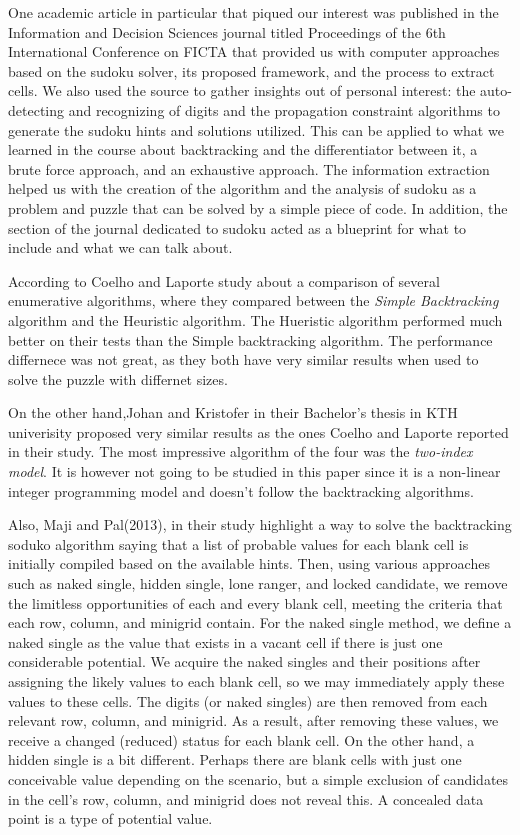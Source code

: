 \documentclass[12pt]{extarticle}
\theoremstyle{plain}
\begin{document}
One academic article in particular that piqued our interest was published in the Information and Decision Sciences journal titled Proceedings of the 6th International Conference on FICTA that provided us with computer approaches based on the sudoku solver, its proposed framework, and the process to extract cells. We also used the source to gather insights out of personal interest: the auto-detecting and recognizing of digits and the propagation constraint algorithms to generate the sudoku hints and solutions utilized. This can be applied to what we learned in the course about backtracking and the differentiator between it, a brute force approach, and an exhaustive approach. The information extraction helped us with the creation of the algorithm and the analysis of sudoku as a problem and puzzle that can be solved by a simple piece of code. In addition, the section of the journal dedicated to sudoku acted as a blueprint for what to include and what we can talk about.

According to Coelho and Laporte study about a comparison of several enumerative algorithms, where they compared between the \textit{Simple Backtracking} algorithm and the Heuristic algorithm. The Hueristic algorithm performed much better on their tests
than the Simple backtracking algorithm. The performance differnece was not great, as they both have very similar results when used to solve the puzzle with differnet sizes.

On the other hand,Johan and Kristofer in their Bachelor's thesis in KTH univerisity proposed very similar results as the ones Coelho and Laporte reported in their study.
The most impressive algorithm of the four was the \textit{two-index model}. It is however not going to be studied in this paper since it is a non-linear integer programming model and doesn't follow the backtracking algorithms.

Also, Maji and Pal(2013), in their study highlight a way to solve the backtracking soduko algorithm saying that a list of probable values for each blank cell is initially compiled based on the available hints. Then, using various approaches such as naked single, hidden single, lone ranger, and locked candidate, we remove the limitless opportunities of each and every blank cell, meeting the criteria that each row, column, and minigrid contain. For the naked single method, we define a naked single as the value that exists in a vacant cell if there is just one considerable potential. We acquire the naked singles and their positions after assigning the likely values to each blank cell, so we may immediately apply these values to these cells. The digits (or naked singles) are then removed from each relevant row, column, and minigrid. As a result, after removing these values, we receive a changed (reduced) status for each blank cell. On the other hand, a hidden single is a bit different. Perhaps there are blank cells with just one conceivable value depending on the scenario, but a simple exclusion of candidates in the cell's row, column, and minigrid does not reveal this. A concealed data point is a type of potential value.
\end{document}
